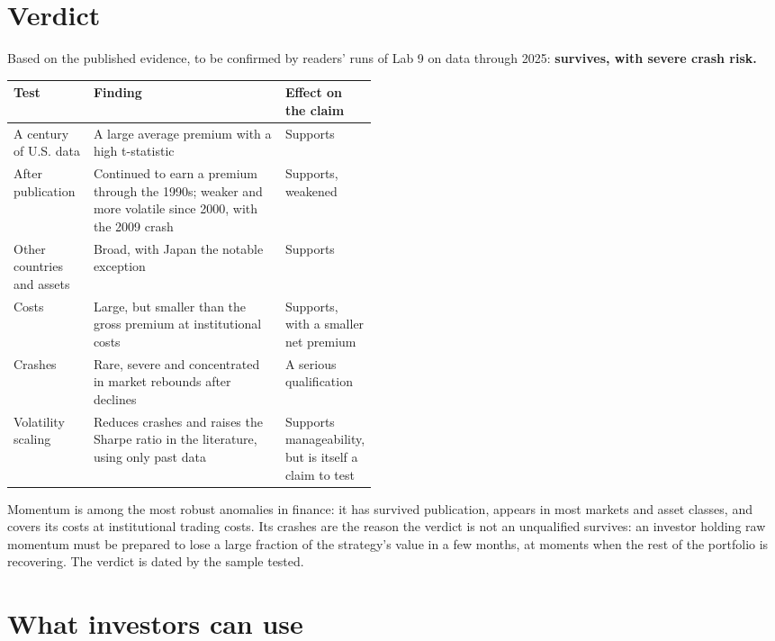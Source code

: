 \section{Verdict}
\label{sec:09-verdict}

Based on the published evidence, to be confirmed by readers' runs of Lab 9 on data through 2025: \textbf{survives, with severe crash risk.}

\begin{center}
\small
\begin{tabularx}{0.9\linewidth}{@{}>{\raggedright\arraybackslash}p{0.22\linewidth}>{\raggedright\arraybackslash}X>{\raggedright\arraybackslash}p{0.25\linewidth}@{}}
\toprule
Test & Finding & Effect on the claim \\
\midrule
A century of U.S. data & A large average premium with a high t-statistic & Supports \\
After publication & Continued to earn a premium through the 1990s; weaker and more volatile since 2000, with the 2009 crash & Supports, weakened \\
Other countries and assets & Broad, with Japan the notable exception & Supports \\
Costs & Large, but smaller than the gross premium at institutional costs & Supports, with a smaller net premium \\
Crashes & Rare, severe and concentrated in market rebounds after declines & A serious qualification \\
Volatility scaling & Reduces crashes and raises the Sharpe ratio in the literature, using only past data & Supports manageability, but is itself a claim to test \\
\bottomrule
\end{tabularx}
\end{center}

Momentum is among the most robust anomalies in finance: it has survived publication, appears in most markets and asset classes, and covers its costs at institutional trading costs. Its crashes are the reason the verdict is not an unqualified survives: an investor holding raw momentum must be prepared to lose a large fraction of the strategy's value in a few months, at moments when the rest of the portfolio is recovering. The verdict is dated by the sample tested.

\section{What investors can use}
\label{sec:09-investors}

